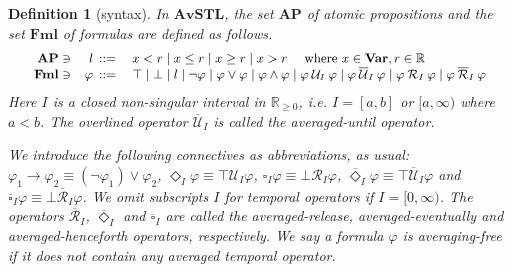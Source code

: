 \documentclass[envcountsect,orivec]{llncs} \usepackage{etex} \usepackage[]{graphicx}
\newif\ifignore \ignorefalse
\newcommand{\auxproof}[1]{
  \ifignore\mbox{}\newline
  \textbf{BEGIN: AUX-PROOF} \dotfill\newline
  {#1}\mbox{}\newline
  \textbf{END: AUX-PROOF}\dotfill\newline
  \fi}
\newtheorem{mydefinition}[mytheorem]{Definition}
\newcommand{\R}{{\mathbb{R}}}
\newcommand{\Var}{\mathbf{Var}}
\newcommand{\Fml}{\mathbf{Fml}}
\newcommand{\FmlNNF}{\mathbf{Fml}_{\mathrm{NNF}}}
\newcommand{\AP}{\mathbf{AP}}
\newcommand{\UntilOp}[1]{\mathbin{\mathcal{U}_{#1}}}
\newcommand{\Release}[1]{\mathbin{\mathcal{R}_{#1}}}
\newcommand{\TUntil}[1]{\mathbin{\overline{\mathcal{U}}_{#1}}}
\newcommand{\TRelease}[1]{\mathbin{\overline{\mathcal{R}}_{#1}}}
\newcommand{\DiaOp}[1]{\Diamond_{#1}}
\newcommand{\BoxOp}[1]{\square_{#1}}
\newcommand{\TDiaOp}[1]{\overline{\Diamond}_{#1}}
\newcommand{\TBoxOp}[1]{\overline{\square}_{#1}}
\newcommand{\AvSTL}{\textbf{AvSTL}}
\newcommand{\Rnn}{\R_{\ge 0}}
\begin{document}
\begin{mydefinition}[syntax]\label{def:syntax}
  In $\AvSTL$, the set $\AP$ of \emph{atomic propositions} and the set
  $\Fml$
  of \emph{formulas} are defined as follows.
    \[\small
    \begin{array}{rrl}
    \AP \ni 
      & l \,::=\,
      & x < r 
        \mid x \leq r 
        \mid x \geq r 
        \mid x > r 
        \quad \text{ where } x \in \Var, r \in \R\\
      \Fml \ni 
      &\varphi \,::=\,
      & \top
        \mid \bot
        \mid l 
        \mid \neg \varphi 
        \mid \varphi \vee \varphi 
        \mid \varphi \wedge \varphi 
        \mid \varphi \UntilOp{I} \varphi 
        \mid \varphi \TUntil{I} \varphi 
        \mid \varphi \Release{I} \varphi 
        \mid \varphi \TRelease{I} \varphi
    \end{array}
  \]
Here $I$ is a closed non-singular interval in $\Rnn$,
  i.e. $I=[a,b]$ or $[a, \infty)$ where $a<b$.
  The overlined operator
  $\TUntil{I}$ is called the \emph{averaged-until} operator.
  
  We introduce the following connectives as abbreviations, as usual:
  \begin{math}
    \varphi_1 \to \varphi_2  \equiv  (\neg \varphi_1) \vee \varphi_2
  \end{math},
  \begin{math}
    \DiaOp{I} \varphi  \equiv  \top \UntilOp{I} \varphi
  \end{math},
  \begin{math}
    \BoxOp{I} \varphi  \equiv  \bot \Release{I} \varphi 
  \end{math},
  \begin{math}
    \TDiaOp{I} \varphi  \equiv  \top \TUntil{I} \varphi
  \end{math} 
  and
  \begin{math}
    \TBoxOp{I} \varphi  \equiv  \bot \TRelease{I} \varphi 
  \end{math}.
We omit subscripts $I$ for temporal operators if $I = [0, \infty)$.
  The operators  $\TRelease{I}$, $\TDiaOp{I}$ and $\TBoxOp{I}$ are called the
  \emph{averaged-release}, \emph{averaged-eventually} and \emph{averaged-henceforth} operators, respectively.
  We say a formula $\varphi$ is \emph{averaging-free}
  if it does not contain any averaged temporal operator.

  
  \auxproof{
    As usual, we can exploit de Morgan-like dualities and push negations
    inwards towards atomic propositions, leading to 
    \emph{negation normal forms (NNF)}. 
    Explicitly, the set $\FmlNNF$ of NNF formulas is defined as
    follows, where $l \in \AP$.
    \[
      \begin{array}{rll}
        \FmlNNF \ni \varphi &\;::=\;&
        \infty \mid \neg \infty 
        \mid l \mid \neg l \mid \varphi_1 \vee \varphi_2 
        \mid \varphi_1 \wedge \varphi_2 \mid\\
        &&\varphi_1 \UntilOp{I} \varphi_2 \mid \varphi_1 \TUntil{I} \varphi_2
        \mid \varphi_1 \Release{I} \varphi_2 \mid \varphi_1 \TRelease{I} \varphi_2
      \end{array}
    \]
}
\end{mydefinition}
\end{document}
